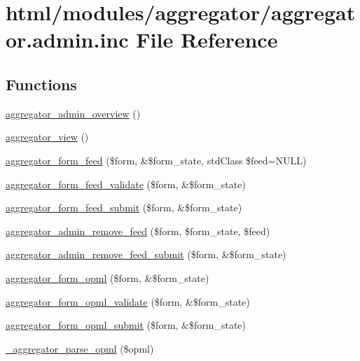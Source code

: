 \hypertarget{aggregator_8admin_8inc}{
\section{html/modules/aggregator/aggregator.admin.inc File Reference}
\label{aggregator_8admin_8inc}
}
\subsection*{Functions}
\begin{DoxyCompactItemize}
\item 
\hyperlink{aggregator_8admin_8inc_a9fe4f30b63dd656ba52c3af570556272}{aggregator\_\-admin\_\-overview} ()
\item 
\hyperlink{aggregator_8admin_8inc_adbb245c75bc2cb47e784fb454e134594}{aggregator\_\-view} ()
\item 
\hyperlink{group__forms_ga6c746c1b1d0d29d1564f215cd1fe69e3}{aggregator\_\-form\_\-feed} (\$form, \&\$form\_\-state, stdClass \$feed=NULL)
\item 
\hyperlink{aggregator_8admin_8inc_a4a4b42f6a1e73d72fb1e55c0f20fcf02}{aggregator\_\-form\_\-feed\_\-validate} (\$form, \&\$form\_\-state)
\item 
\hyperlink{aggregator_8admin_8inc_af98f428f07034e19622342875fe30984}{aggregator\_\-form\_\-feed\_\-submit} (\$form, \&\$form\_\-state)
\item 
\hyperlink{aggregator_8admin_8inc_ab735494011ac94fbb352e6161f91e7c2}{aggregator\_\-admin\_\-remove\_\-feed} (\$form, \$form\_\-state, \$feed)
\item 
\hyperlink{aggregator_8admin_8inc_a6129f0a0c72d8e0ada1fb2f4cd40519d}{aggregator\_\-admin\_\-remove\_\-feed\_\-submit} (\$form, \&\$form\_\-state)
\item 
\hyperlink{group__forms_gaf23a2363758db071378145309e4ee993}{aggregator\_\-form\_\-opml} (\$form, \&\$form\_\-state)
\item 
\hyperlink{aggregator_8admin_8inc_a62f9c539278bc79a398c545ff7c7ec60}{aggregator\_\-form\_\-opml\_\-validate} (\$form, \&\$form\_\-state)
\item 
\hyperlink{aggregator_8admin_8inc_a6ecc54a12406fb7c756c204966dd00cd}{aggregator\_\-form\_\-opml\_\-submit} (\$form, \&\$form\_\-state)
\item 
\hyperlink{aggregator_8admin_8inc_a96380c072c48c71f9b71574600be61d3}{\_\-aggregator\_\-parse\_\-opml} (\$opml)
\item 

\end{DoxyCompactItemize}
